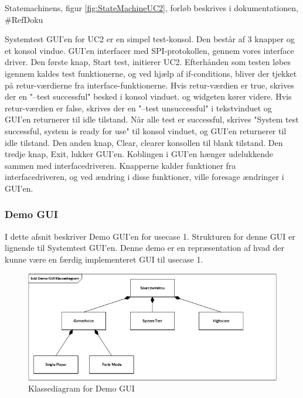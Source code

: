 Statemachinens, figur \ref{fig:StateMachineUC2}, forløb beskrives i dokumentationen, \#RefDoku

Systemtest GUI'en for UC2 er en simpel test-konsol. Den består af 3 knapper og et konsol vindue. GUI'en interfacer med SPI-protokollen, gennem vores interface driver. Den første knap, Start test, initierer UC2. Efterhånden som testen løbes igennem kaldes test funktionerne, og ved hjælp af if-conditions, bliver der tjekket på retur-værdierne fra interface-funktionerne. Hvis retur-værdien er true, skrives der en "--test successful" besked i konsol vinduet. og widgeten kører videre. Hvis retur-værdien er false, skrives der en "--test unsuccessful" i tekstvinduet og GUI'en returnerer til idle tilstand. Når alle test er successful, skrives "System test successful, system is ready for use" til konsol vinduet, og GUI'en returnerer til idle tilstand. Den anden knap, Clear, clearer konsollen til blank tilstand. Den tredje knap, Exit, lukker GUI'en.
Koblingen i GUI'en hænger udelukkende sammen med interfacedriveren. Knapperne kalder funktioner fra interfacedriveren, og ved ændring i disse funktioner, ville foresage ændringer i GUI'en.

\subsubsection{Demo GUI}

I dette afsnit beskriver Demo GUI'en for usecase 1.
Strukturen for denne GUI er lignende til Systemtest GUI'en.
Denne demo er en repræsentation af hvad der kunne være en færdig implementeret
GUI til usecase 1.

\begin{figure}[H]
	\centering
	\includegraphics[width=1.2\textwidth]{Afsnit/DesignOgImplementering/images/DemoGUIClass}
	\caption{Klassediagram for Demo GUI}
	\label{fig:DemoGUIClass}
\end{figure}

